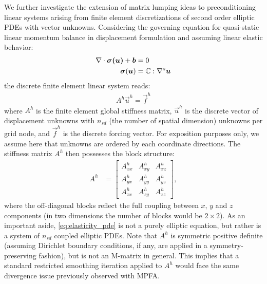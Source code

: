 We further investigate the extension of matrix lumping ideas to preconditioning linear systems arising from finite element discretizations of second order elliptic PDEs with vector unknowns.   Considering the governing equation for quasi-static linear momentum balance in displacement formulation and assuming linear elastic behavior:
\begin{align}
    \nabla \cdot \bm{\sigma(\bm{u})} + \bm{b} &= 0 \\
    \bm{\sigma}(\bm{u}) &= \mathbb{C} : \nabla^s \bm{u}
    \label{eq:elasticity_pde}
\end{align}
the discrete finite element linear system reads:
\begin{align}
    A^h\vec{u}^h = \vec{f}^h
\end{align}
where $A^h$ is the finite element global stiffness matrix, $\vec{u}^h$ is the discrete vector of displacement unknowns with $n_{sd}$ (the number of spatial dimension) unknowns per grid node, and $\vec{f}^h$ is the discrete forcing vector.   For exposition purposes only, we assume here that unknowns are ordered by each coordinate directions.   The stiffness matrix $A^h$ then possesses the block structure:
\begin{align}
	A^h &=
    \begin{bmatrix}
        A_{xx}^h & A_{xy}^h & A_{xz}^h \\
        A_{yx}^h & A_{yy}^h & A_{yz}^h \\
        A_{zx}^h & A_{zy}^h & A_{zz}^h 
	\end{bmatrix},
	\label{eq:blk_stiff}
\end{align}
where the off-diagonal blocks reflect the full coupling between $x$, $y$ and $z$ components (in two dimensions the number of blocks would be $2 \times 2$).   As an important aside, \cref{eq:elasticity_pde} is not a purely elliptic equation, but rather is a system of $n_{sd}$ coupled elliptic PDEs.   Note that $A^h$ is symmetric positive definite (assuming Dirichlet boundary conditions, if any, are applied in a symmetry-preserving fashion), but is not an M-matrix in general.   This implies that a standard restricted smoothing iteration applied to $A^h$ would face the same divergence issue previously observed with MPFA.


